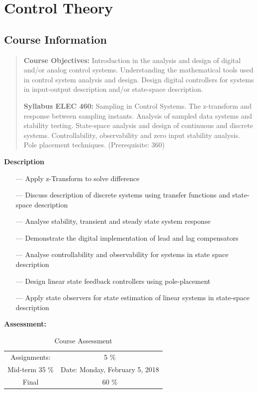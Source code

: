 \documentclass{scrreprt}
\theoremstyle{plain}
\theoremstyle{definition}
\theoremstyle{remark}
\begin{document}
\printindex

\part{Control Theory}
\chapter{Course Information}
\begin{quote}
\textbf{Course Objectives:} Introduction in the analysis and design of digital and/or analog control systems.
Understanding the mathematical tools used in control system analysis and design.
Design digital controllers for systems in input-output description and/or state-space description.

\textbf{Syllabus ELEC 460:} Sampling in Control Systems. The z-transform and response between sampling instants. Analysis of
sampled data systems and stability testing. State-space analysis and design of continuous and discrete systems.
Controllability, observability and zero input stability analysis. Pole placement techniques. (Prerequisite: 360)

\end{quote}

\textbf{Description}
\begin{itemize}
\item[---] Apply z-Transform to solve difference
\item[---] Discuss description of discrete systems using transfer functions and state-space description
\item[---] Analyse stability, transient and steady state system response
\item[---] Demonstrate the digital implementation of lead and lag compensators
\item[---] Analyse controllability and observability for systems in state space description
\item[---] Design linear state feedback controllers using pole-placement
\item[---] Apply state observers for state estimation of linear systems in state-space description
\end{itemize}

\textbf{Assessment:}
\begin{table}
\begin{tabular}{c c }
Assignments: & 5 \% \\
Mid-term 35 \% & Date: Monday, February 5, 2018 \\
Final &  60 \% 
\end{tabular}
\caption{Course Assessment}
\end{table}
\end{document}
